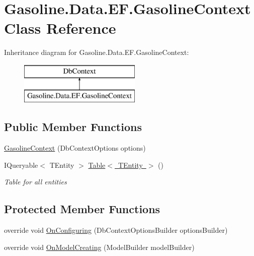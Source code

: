 \hypertarget{class_gasoline_1_1_data_1_1_e_f_1_1_gasoline_context}{}\section{Gasoline.\+Data.\+E\+F.\+Gasoline\+Context Class Reference}
\label{class_gasoline_1_1_data_1_1_e_f_1_1_gasoline_context}
Inheritance diagram for Gasoline.\+Data.\+E\+F.\+Gasoline\+Context\+:\begin{figure}[H]
\begin{center}
\leavevmode
\includegraphics[height=2.000000cm]{class_gasoline_1_1_data_1_1_e_f_1_1_gasoline_context}
\end{center}
\end{figure}
\subsection*{Public Member Functions}
\begin{DoxyCompactItemize}
\item 
\mbox{\hyperlink{class_gasoline_1_1_data_1_1_e_f_1_1_gasoline_context_abbf16bea44a1be3b046023d61714b610}{Gasoline\+Context}} (Db\+Context\+Options options)
\item 
I\+Queryable$<$ T\+Entity $>$ \mbox{\hyperlink{class_gasoline_1_1_data_1_1_e_f_1_1_gasoline_context_af9496b967fdbccfb12a45dc5caff7d2f}{Table$<$ T\+Entity $>$}} ()
\begin{DoxyCompactList}\small\item\em Table for all entities \end{DoxyCompactList}\end{DoxyCompactItemize}
\subsection*{Protected Member Functions}
\begin{DoxyCompactItemize}
\item 
override void \mbox{\hyperlink{class_gasoline_1_1_data_1_1_e_f_1_1_gasoline_context_aabbd11882da78b619167898c0df81118}{On\+Configuring}} (Db\+Context\+Options\+Builder options\+Builder)
\item 
override void \mbox{\hyperlink{class_gasoline_1_1_data_1_1_e_f_1_1_gasoline_context_a820e088d42800438ca9380566ef68bb7}{On\+Model\+Creating}} (Model\+Builder model\+Builder)
\end{DoxyCompactItemize}


